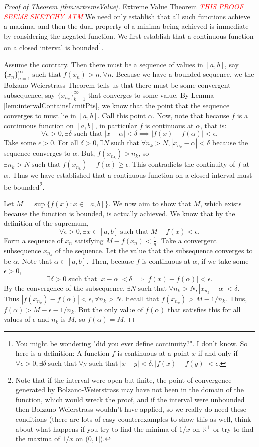 \documentclass{article}[11pt]
\newcommand{\bad}[1]{\emph{\textcolor{red}{#1}}}
\DeclareMathOperator{\st}{\text{ such that }}
\begin{document}
\begin{proof}[Proof of Theorem \ref{thm:extremeValue}]{Extreme Value Theorem}
	\bad{THIS PROOF SEEMS SKETCHY ATM}
	We need only establish that all such functions achieve a maxima, and then the dual property of a minima being achieved is immediate by considering the negated function.
We first establish that a continuous function on a closed interval is bounded\footnote{You might be wondering "did you ever define continuity?". I don't know. So here is a definition: A function $f$ is continuous at a point $x$ if and only if $\forall \epsilon > 0, \exists \delta \st \forall $y$ \st |x-y|<\delta, |f(x)-f(y)|<\epsilon$.}.

Assume the contrary. 
Then there must be a sequence of values in $[a,b]$, say $\{x_n\}_{n=1}^\infty \st f(x_n) > n, \forall n$.
Because we have a bounded sequence, we the Bolzano-Weierstrass Theorem tells us that there must be some convergent subsequence, say $\{x_{n_k}\}_{k=1}^\infty$ that converges to some value. 
By Lemma \ref{lem:intervalContainsLimitPts}, we know that the point that the sequence converges to must lie in $[a,b]$. Call this point $\alpha$.
Now, note that because $f$ is a continuous function on $[a,b]$, in particular $f$ is continuous at $\alpha$, that is:
$$\forall \epsilon > 0, \exists \delta \st |x-\alpha| < \delta \implies |f(x)-f(\alpha)| < \epsilon.$$
Take some $\epsilon > 0$. For all $\delta > 0, \exists N \st \forall n_k > N, |x_{n_k} - \alpha| < \delta$ because the sequence converges to $\alpha$.
But, $f(x_{n_k}) > n_k$, so $\exists n_k > N \st f(x_{n_k}) - f(\alpha) \ge \epsilon$.
This contradicts the continuity of $f$ at $\alpha$.
Thus we have established that a continuous function on a closed interval must be bounded\footnote{Note that if the interval were open but finite, the point of convergence generated by Bolzano-Weierstrass may have not been in the domain of the function, which would wreck the proof, and if the interval were unbounded then Bolzano-Weierstrass wouldn't have applied, so we really do need these conditions (there are lots of easy counterexamples to show this as well, think about what happens if you try to find the minima of $1/x$ on $\mathbb{R}^+$ or try to find the maxima of $1/x$ on $(0,1]$).}.

Let $M = \sup{\{f(x) : x \in [a, b]\}}$. We now aim to show that $M$, which exists because the function is bounded, is actually achieved. 
We know that by the definition of the supremum, 
$$\forall \epsilon > 0, \exists x\in [a,b] \st M-f(x) < \epsilon.$$
Form a sequence of $x_n$ satisfying $M-f(x_n) < \frac{1}{n}$.
Take a convergent subsequence $x_{n_k}$ of the sequence. 
Let the value that the subsequence converges to be $\alpha$. 
Note that $\alpha \in [a, b]$.
Then, because $f$ is continuous at $\alpha$, if we take some $\epsilon > 0$, 
$$ \exists \delta > 0 \st |x-\alpha| < \delta \implies |f(x) - f(\alpha)| < \epsilon.$$
By the convergence of the subsequence, $\exists N \st \forall n_k > N, |x_{n_k}  - \alpha| < \delta.$
Thus $|f(x_{n_k}) - f(\alpha)| < \epsilon, \forall n_k > N$.
Recall that $f(x_{n_k}) > M - 1/n_k$.
Thus, 
$f(\alpha) > M - \epsilon - 1/n_k$.
But the only value of $f(\alpha)$ that satisfies this for all values of $\epsilon$ and $n_k$ is $M$, so $f(\alpha) = M$.


\end{proof}
\end{document}
